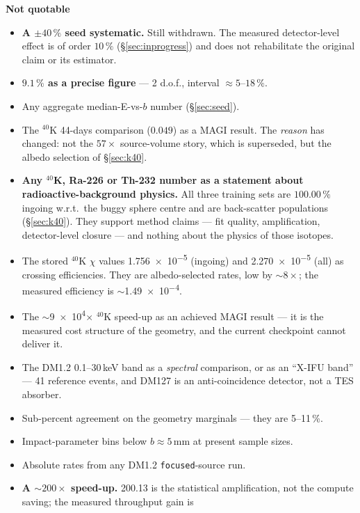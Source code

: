 \documentclass[11pt,a4paper]{article}
\newenvironment{callout}[3]%
{\par\medskip\noindent
 \def\calloutframe{#1}\def\calloutback{#2}%
 \setlength{\fboxrule}{0.9pt}\setlength{\fboxsep}{8pt}%
 \begin{lrbox}{\calloutbox}%
 \begin{minipage}{\dimexpr\textwidth-2\fboxsep-2\fboxrule\relax}%
 \setlength{\parskip}{4pt}%
 \textcolor{#1}{\textbf{#3}}\par\nobreak\smallskip}
{\end{minipage}\end{lrbox}%
 \fcolorbox{\calloutframe}{\calloutback}{\usebox{\calloutbox}}%
 \par\medskip}
\begin{document}
\begin{callout}{warn}{red!4}{Not quotable}
\begin{itemize}[nosep]
  \item \textbf{A $\pm40\,\%$ seed systematic.} Still withdrawn. The measured
        detector-level effect is of order $10\,\%$ (\S\ref{sec:inprogress}) and
        does not rehabilitate the original claim or its estimator.
  \item \textbf{$9.1\,\%$ as a precise figure} --- 2 d.o.f., interval
        $\approx5$--$18\,\%$.
  \item Any aggregate median-E-vs-$b$ number (\S\ref{sec:seed}).
  \item The $^{40}$K 44-days comparison ($0.049$) as a MAGI result. The
        \emph{reason} has changed: not the $57\times$ source-volume story, which
        is superseded, but the albedo selection of \S\ref{sec:k40}.
  \item \textbf{Any $^{40}$K, Ra-226 or Th-232 number as a statement about
        radioactive-background physics.} All three training sets are
        $100.00\,\%$ ingoing w.r.t.\ the buggy sphere centre and are
        back-scatter populations (\S\ref{sec:k40}). They support method claims
        --- fit quality, amplification, detector-level closure --- and nothing
        about the physics of those isotopes.
  \item The stored $^{40}$K $\chi$ values \num{1.756e-5} (ingoing) and
        \num{2.270e-5} (all) as crossing efficiencies. They are albedo-selected
        rates, low by $\sim$$8\times$; the measured efficiency is
        $\sim$\num{1.49e-4}.
  \item The $\sim$\num{9e4}$\times$ $^{40}$K speed-up as an achieved MAGI
        result --- it is the measured cost structure of the geometry, and the
        current checkpoint cannot deliver it.
  \item The DM1.2 0.1--30\,keV band as a \emph{spectral} comparison, or as
        an ``X-IFU band'' --- 41 reference events, and DM127 is an
        anti-coincidence detector, not a TES absorber.
  \item Sub-percent agreement on the geometry marginals --- they are 5--11\,\%.
  \item Impact-parameter bins below $b \approx 5$\,mm at present sample sizes.
  \item Absolute rates from any DM1.2 \texttt{focused}-source run.
  \item \textbf{A ${\sim}200\times$ speed-up.} 200.13 is the statistical
        amplification, not the compute saving; the measured throughput gain is
$$
\end{itemize}
\end{callout}
\end{document}
